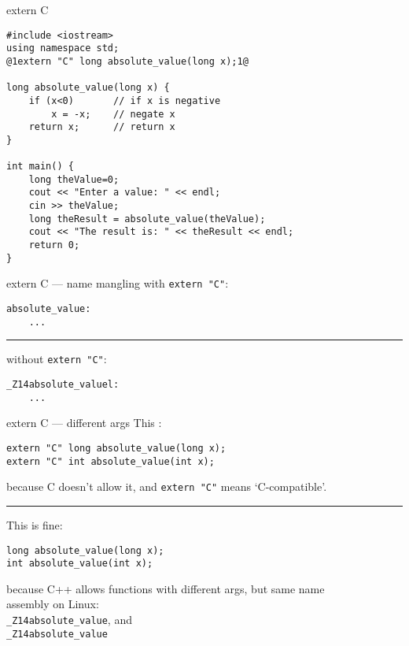 \begin{frame}[fragile,label=absValueCForExternC]{extern \textquotedbl{}C\textquotedbl{}}
\begin{lstlisting}
#include <iostream>
using namespace std;
@1extern "C" long absolute_value(long x);1@

long absolute_value(long x) {
    if (x<0)       // if x is negative
        x = -x;    // negate x
    return x;      // return x
}

int main() {
    long theValue=0;
    cout << "Enter a value: " << endl;
    cin >> theValue;
    long theResult = absolute_value(theValue);
    cout << "The result is: " << theResult << endl;
    return 0;
}
\end{lstlisting}
\end{frame}

\begin{frame}[fragile,label=externCMangle]{extern \textquotedbl{}C\textquotedbl{} --- name mangling}
with \texttt{extern "C"}:
\begin{lstlisting}
absolute_value:
    ...
\end{lstlisting}
\hrule
without \texttt{extern "C"}:
\begin{lstlisting}
_Z14absolute_valuel:
    ...
\end{lstlisting}
\end{frame}

\begin{frame}[fragile,label=externCArgs]{extern C --- different args}
This :
\begin{lstlisting}
extern "C" long absolute_value(long x);
extern "C" int absolute_value(int x);
\end{lstlisting}
because C doesn't allow it, and \texttt{extern "C"} means `C-compatible'.
    \vspace{.5cm}
\hrule
    \vspace{.5cm}
This is fine:
\begin{lstlisting}
long absolute_value(long x);
int absolute_value(int x);
\end{lstlisting}
because C++ allows functions with different args, but same name \\
assembly on Linux: \\
    \hspace{2cm}\texttt{\_Z14absolute\_value}, and \\
    \hspace{2cm}\texttt{\_Z14absolute\_value}
\end{frame}
